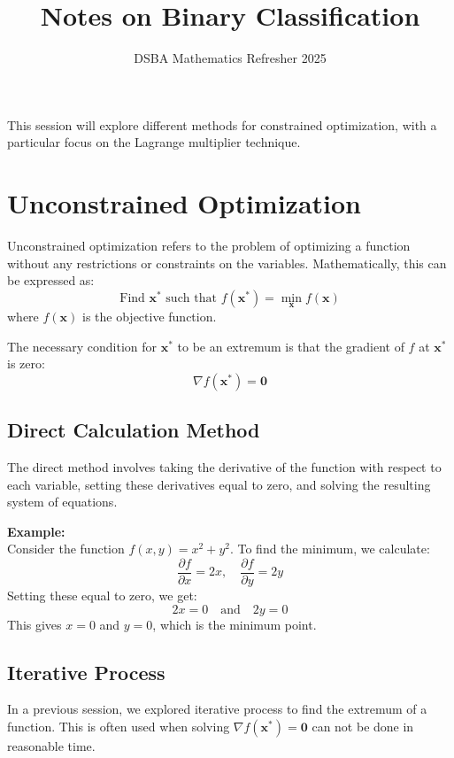 \documentclass[]{article}
\title{Notes on Binary Classification}
\author{DSBA Mathematics Refresher 2025}
\date{}
\begin{document}
	
	\maketitle
	
	\begin{abstract}
		
	\end{abstract}
	
	This session will explore different methods for constrained optimization, with a particular focus on the Lagrange multiplier technique.
	
	\section{Unconstrained Optimization}
	
	Unconstrained optimization refers to the problem of optimizing a function without any restrictions or constraints on the variables.
	Mathematically, this can be expressed as:
	$$
	\text{Find } \mathbf{x}^* \text{ such that } f(\mathbf{x}^*) = \min_{\mathbf{x}} f(\mathbf{x})
	$$
	where $f(\mathbf{x})$ is the objective function.
	
	The necessary condition for \(\mathbf{x}^*\) to be an extremum is that the gradient of $f$ at $\mathbf{x}^*$ is zero:
	$$
	\nabla f(\mathbf{x}^*) = \mathbf{0}
	$$
	
	\subsection{Direct Calculation Method}
	The direct method involves taking the derivative of the function with respect to each variable, setting these derivatives equal to zero, and solving the resulting system of equations.
	
	\textbf{Example:}
	\noindent\\
	Consider the function $f(x, y) = x^2 + y^2$. To find the minimum, we calculate:
	$$
	\frac{\partial f}{\partial x} = 2x, \quad \frac{\partial f}{\partial y} = 2y
	$$
	Setting these equal to zero, we get:
	$$
	2x = 0 \quad \text{and} \quad 2y = 0
	$$
	This gives $x = 0$ and $y = 0$, which is the minimum point.
	
	\subsection{Iterative Process}
	In a previous session, we explored iterative process to find the extremum of a function.
	This is often used when solving $\nabla f(\mathbf{x}^*) = \mathbf{0}$ can not be done in reasonable time.
	
\end{document}
